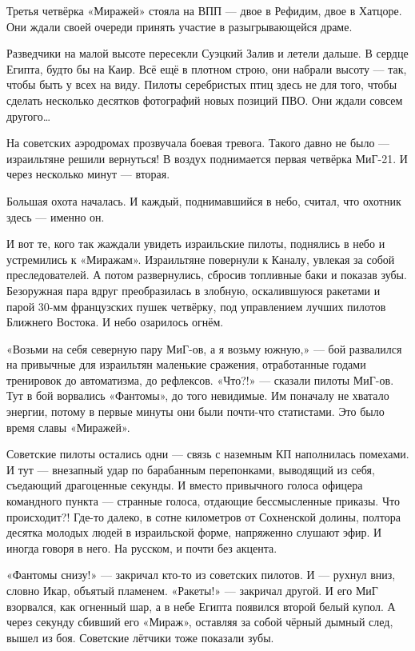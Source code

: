 Третья четвёрка «Миражей» стояла на ВПП — двое в Рефидим, двое в Хатцоре. Они ждали своей очереди принять участие в разыгрывающейся драме.

Разведчики на малой высоте пересекли Суэцкий Залив и летели дальше. В сердце Египта, будто бы на Каир. Всё ещё в плотном строю, они набрали высоту — так, чтобы быть у всех на виду. Пилоты серебристых птиц здесь не для того, чтобы сделать несколько десятков фотографий новых позиций ПВО. Они ждали совсем другого…

На советских аэродромах прозвучала боевая тревога. Такого давно не было — израильтяне решили вернуться! В воздух поднимается первая четвёрка МиГ-21. И через несколько минут — вторая.

Большая охота началась. И каждый, поднимавшийся в небо, считал, что охотник здесь — именно он.

И вот те, кого так жаждали увидеть израильские пилоты, поднялись в небо и устремились к «Миражам». Израильтяне повернули к Каналу, увлекая за собой преследователей. А потом развернулись, сбросив топливные баки и показав зубы. Безоружная пара вдруг преобразилась в злобную, оскалившуюся ракетами и парой 30-мм французских пушек четвёрку, под управлением лучших пилотов Ближнего Востока. И небо озарилось огнём.

«Возьми на себя северную пару МиГ-ов, а я возьму южную,» — бой развалился на привычные для израильтян маленькие сражения, отработанные годами тренировок до автоматизма, до рефлексов. «Что?!» — сказали пилоты МиГ-ов. Тут в бой ворвались «Фантомы», до того невидимые. Им поначалу не хватало энергии, потому в первые минуты они были почти-что статистами. Это было время славы «Миражей».

Советские пилоты остались одни — связь с наземным КП наполнилась помехами. И тут — внезапный удар по барабанным перепонками, выводящий из себя, съедающий драгоценные секунды. И вместо привычного голоса офицера командного пункта — странные голоса, отдающие бессмысленные приказы. Что происходит?! Где-то далеко, в сотне километров от Сохненской долины, полтора десятка молодых людей в израильской форме, напряженно слушают эфир. И иногда говоря в него. На русском, и почти без акцента.

«Фантомы снизу!» — закричал кто-то из советских пилотов. И — рухнул вниз, словно Икар, объятый пламенем. «Ракеты!» — закричал другой. И его МиГ взорвался, как огненный шар, а в небе Египта появился второй белый купол. А через секунду сбивший его «Мираж», оставляя за собой чёрный дымный след, вышел из боя. Советские лётчики тоже показали зубы.

